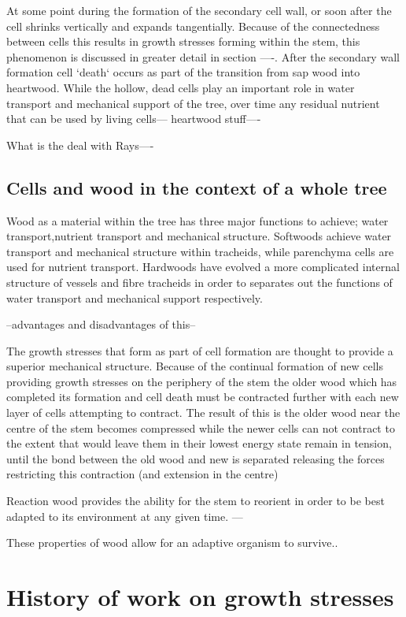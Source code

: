 \documentclass{article}
\begin{document}
At some point during the formation of the secondary cell wall, or soon after the
cell shrinks vertically and expands tangentially. Because of the connectedness
between cells this results in growth stresses forming within the stem, this
phenomenon is discussed in greater detail in section ----. After the secondary
wall formation cell `death` occurs as part of the transition from sap wood into
heartwood. While the hollow, dead cells play an important role in water
transport and mechanical support of the tree, over time any residual nutrient
that can be used by living cells--- heartwood stuff----

What is the deal with Rays----

\subsection{Cells and wood in the context of a whole tree}
Wood as a material within the tree has three major functions to achieve; water
transport,nutrient transport and mechanical structure. Softwoods achieve
water transport and mechanical structure within tracheids, while parenchyma cells
are used for nutrient transport. Hardwoods have evolved a more complicated
internal structure of vessels and fibre tracheids in order to separates out the
functions of water transport and mechanical support respectively.

--advantages and disadvantages of this--

The growth stresses that form as part of cell formation are thought to provide
a superior mechanical structure. Because of the continual formation of new
cells providing growth stresses on the periphery of the stem the older wood
which has completed its formation and cell death must be contracted further with each
new layer of cells attempting to contract. The result of this is the older wood
near the centre of the stem becomes compressed while the newer cells can not
contract to the extent that would leave them in their lowest energy state
remain in tension, until the bond between the old wood and new is separated
releasing the forces restricting this contraction (and extension in the centre)

Reaction wood provides the ability for the stem to reorient
in order to be best adapted to its environment at any given time. ---

These properties of wood allow for an adaptive organism to survive..

\section{History of work on growth stresses}
\end{document}
